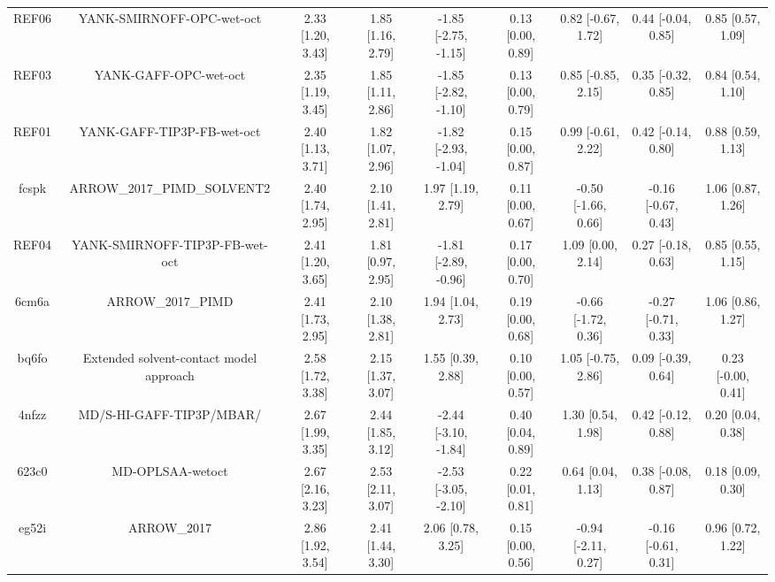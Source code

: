 \documentclass{article}
\begin{document}
\begin{center}
\begin{longtable}{|ccccccccc|}
 REF06 &                          YANK-SMIRNOFF-OPC-wet-oct &  2.33 [1.20, 3.43] &  1.85 [1.16, 2.79] &  -1.85 [-2.75, -1.15] &  0.13 [0.00, 0.89] &   0.82 [-0.67, 1.72] &   0.44 [-0.04, 0.85] &     0.85 [0.57, 1.09] \\
 REF03 &                              YANK-GAFF-OPC-wet-oct &  2.35 [1.19, 3.45] &  1.85 [1.11, 2.86] &  -1.85 [-2.82, -1.10] &  0.13 [0.00, 0.79] &   0.85 [-0.85, 2.15] &   0.35 [-0.32, 0.85] &     0.84 [0.54, 1.10] \\
 REF01 &                         YANK-GAFF-TIP3P-FB-wet-oct &  2.40 [1.13, 3.71] &  1.82 [1.07, 2.96] &  -1.82 [-2.93, -1.04] &  0.15 [0.00, 0.87] &   0.99 [-0.61, 2.22] &   0.42 [-0.14, 0.80] &     0.88 [0.59, 1.13] \\
 fcspk &                        ARROW\_2017\_PIMD\_SOLVENT2 &  2.40 [1.74, 2.95] &  2.10 [1.41, 2.81] &     1.97 [1.19, 2.79] &  0.11 [0.00, 0.67] &  -0.50 [-1.66, 0.66] &  -0.16 [-0.67, 0.43] &     1.06 [0.87, 1.26] \\
 REF04 &                     YANK-SMIRNOFF-TIP3P-FB-wet-oct &  2.41 [1.20, 3.65] &  1.81 [0.97, 2.95] &  -1.81 [-2.89, -0.96] &  0.17 [0.00, 0.70] &    1.09 [0.00, 2.14] &   0.27 [-0.18, 0.63] &     0.85 [0.55, 1.15] \\
 6cm6a &                                  ARROW\_2017\_PIMD &  2.41 [1.73, 2.95] &  2.10 [1.38, 2.81] &     1.94 [1.04, 2.73] &  0.19 [0.00, 0.68] &  -0.66 [-1.72, 0.36] &  -0.27 [-0.71, 0.33] &     1.06 [0.86, 1.27] \\
 bq6fo &            Extended solvent-contact model approach &  2.58 [1.72, 3.38] &  2.15 [1.37, 3.07] &     1.55 [0.39, 2.88] &  0.10 [0.00, 0.57] &   1.05 [-0.75, 2.86] &   0.09 [-0.39, 0.64] &    0.23 [-0.00, 0.41] \\
 4nfzz &                           MD/S-HI-GAFF-TIP3P/MBAR/ &  2.67 [1.99, 3.35] &  2.44 [1.85, 3.12] &  -2.44 [-3.10, -1.84] &  0.40 [0.04, 0.89] &    1.30 [0.54, 1.98] &   0.42 [-0.12, 0.88] &     0.20 [0.04, 0.38] \\
 623c0 &                                   MD-OPLSAA-wetoct &  2.67 [2.16, 3.23] &  2.53 [2.11, 3.07] &  -2.53 [-3.05, -2.10] &  0.22 [0.01, 0.81] &    0.64 [0.04, 1.13] &   0.38 [-0.08, 0.87] &     0.18 [0.09, 0.30] \\
 eg52i &                                        ARROW\_2017 &  2.86 [1.92, 3.54] &  2.41 [1.44, 3.30] &     2.06 [0.78, 3.25] &  0.15 [0.00, 0.56] &  -0.94 [-2.11, 0.27] &  -0.16 [-0.61, 0.31] &     0.96 [0.72, 1.22] \\

\end{longtable}
\end{center}
\end{document}
